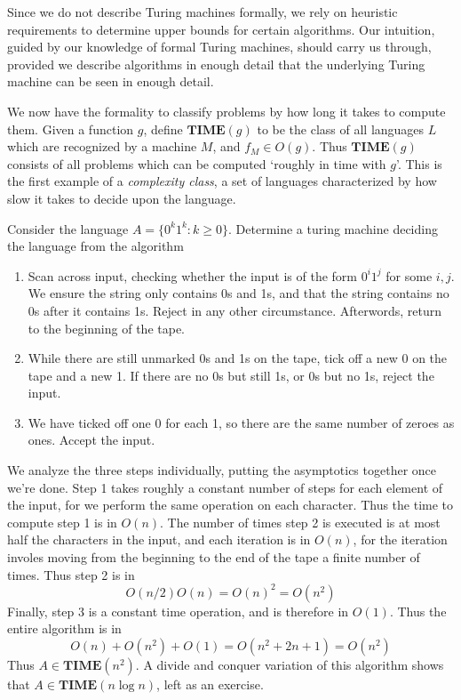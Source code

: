 Since we do not describe Turing machines formally, we rely on heuristic requirements to determine upper bounds for certain algorithms. Our intuition, guided by our knowledge of formal Turing machines, should carry us through, provided we describe algorithms in enough detail that the underlying Turing machine can be seen in enough detail.

We now have the formality to classify problems by how long it takes to compute them. Given a function $g$, define $\mathbf{TIME}(g)$ to be the class of all languages $L$ which are recognized by a machine $M$, and $f_M \in O(g)$. Thus $\mathbf{TIME}(g)$ consists of all problems which can be computed `roughly in time with $g$'. This is the first example of a \emph{complexity class}, a set of languages characterized by how slow it takes to decide upon the language.

\begin{example}
    Consider the language $A = \{ 0^k1^k : k \geq 0 \}$. Determine a turing machine deciding the language from the algorithm
    \begin{enumerate}
        \item Scan across input, checking whether the input is of the form $0^i 1^j$ for some $i,j$. We ensure the string only contains 0s and 1s, and that the string contains no 0s after it contains 1s. Reject in any other circumstance. Afterwords, return to the beginning of the tape.
        \item While there are still unmarked 0s and 1s on the tape, tick off a new 0 on the tape and a new 1. If there are no 0s but still 1s, or 0s but no 1s, reject the input.
        \item We have ticked off one 0 for each 1, so there are the same number of zeroes as ones. Accept the input.
    \end{enumerate}
    We analyze the three steps individually, putting the asymptotics together once we're done. Step 1 takes roughly a constant number of steps for each element of the input, for we perform the same operation on each character. Thus the time to compute step 1 is in $O(n)$. The number of times step 2 is executed is at most half the characters in the input, and each iteration is in $O(n)$, for the iteration involes moving from the beginning to the end of the tape a finite number of times. Thus step 2 is in
    \[ O(n/2)O(n) = O(n)^2 = O(n^2) \]
    Finally, step 3 is a constant time operation, and is therefore in $O(1)$. Thus the entire algorithm is in
    \[ O(n) + O(n^2) + O(1) = O(n^2 + 2n + 1) = O(n^2) \]
    Thus $A \in \mathbf{TIME}(n^2)$. A divide and conquer variation of this algorithm shows that $A \in \mathbf{TIME}(n \log n)$, left as an exercise.
\end{example}

